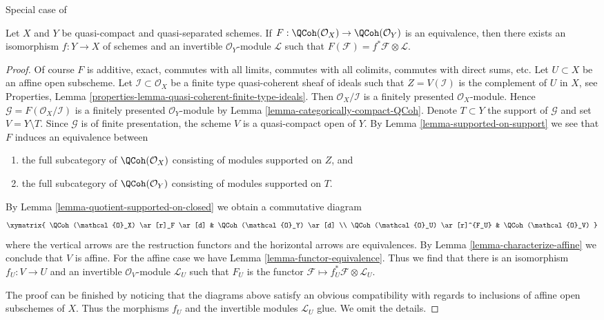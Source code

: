 \begin{proposition}
\label{proposition-gabriel-rosenberg}
\begin{reference}
Special case of \cite[Theorem 1.2]{Brandenburg}
\end{reference}
Let $X$ and $Y$ be quasi-compact and quasi-separated schemes.
If $F : \QCoh(\mathcal{O}_X) \to \QCoh(\mathcal{O}_Y)$
is an equivalence, then there exists an isomorphism
$f : Y \to X$ of schemes and an invertible $\mathcal{O}_Y$-module
$\mathcal{L}$ such that $F(\mathcal{F}) = f^*\mathcal{F} \otimes \mathcal{L}$.
\end{proposition}

\begin{proof}
Of course $F$ is additive, exact, commutes with all limits,
commutes with all colimits, commutes with direct sums, etc.
Let $U \subset X$ be an affine open subscheme.
Let $\mathcal{I} \subset \mathcal{O}_X$ be a finite type
quasi-coherent sheaf of ideals such that $Z = V(\mathcal{I})$
is the complement of $U$ in $X$, see
Properties, Lemma \ref{properties-lemma-quasi-coherent-finite-type-ideals}.
Then $\mathcal{O}_X/\mathcal{I}$ is a finitely presented
$\mathcal{O}_X$-module. Hence $\mathcal{G} = F(\mathcal{O}_X/\mathcal{I})$
is a finitely presented $\mathcal{O}_Y$-module by
Lemma \ref{lemma-categorically-compact-QCoh}.
Denote $T \subset Y$ the support of $\mathcal{G}$ and set
$V = Y \setminus T$. Since $\mathcal{G}$ is of finite presentation,
the scheme $V$ is a quasi-compact open of $Y$.
By Lemma \ref{lemma-supported-on-support} we see that $F$ induces an
equivalence between
\begin{enumerate}
\item the full subcategory of $\QCoh(\mathcal{O}_X)$ consisting
of modules supported on $Z$, and
\item the full subcategory of $\QCoh(\mathcal{O}_Y)$ consisting
of modules supported on $T$.
\end{enumerate}
By Lemma \ref{lemma-quotient-supported-on-closed} we obtain a commutative
diagram
$$
\xymatrix{
\QCoh(\mathcal{O}_X) \ar[r]_F \ar[d] &
\QCoh(\mathcal{O}_Y) \ar[d] \\
\QCoh(\mathcal{O}_U) \ar[r]^{F_U} &
\QCoh(\mathcal{O}_V)
}
$$
where the vertical arrows are the restruction functors and the
horizontal arrows are equivalences. By Lemma \ref{lemma-characterize-affine}
we conclude that $V$ is affine. For the affine case we have
Lemma \ref{lemma-functor-equivalence}. Thus we find that there
is an isomorphism $f_U : V \to U$ and an invertible
$\mathcal{O}_V$-module $\mathcal{L}_U$ such that
$F_U$ is the functor
$\mathcal{F} \mapsto f_U^*\mathcal{F} \otimes \mathcal{L}_U$.

\medskip\noindent
The proof can be finished by noticing that the diagrams above
satisfy an obvious compatibility with regards to inclusions
of affine open subschemes of $X$. Thus the morphisms $f_U$ and the
invertible modules $\mathcal{L}_U$ glue. We omit the details.
\end{proof}











